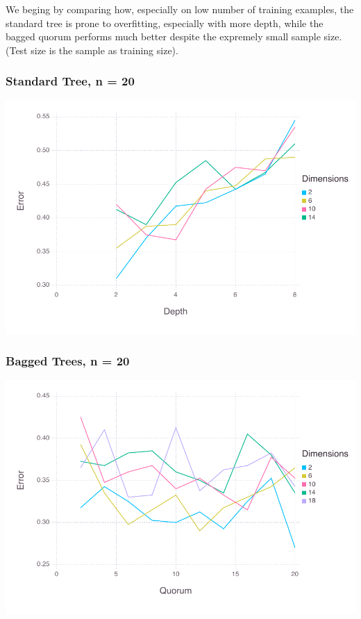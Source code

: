 \documentclass[a4paper,12pt]{article}
\begin{document}
We beging by comparing how, especially on low number of training examples, the standard tree is prone to overfitting, especially with more depth, while the bagged quorum performs much better despite the expremely small sample size. (Test size is the sample as training size).

\subsubsection*{Standard Tree, n = 20}
\includegraphics[width=\linewidth]{figures/problemset_2_1.pdf}



\subsubsection*{Bagged Trees, n = 20}
\includegraphics[width=\linewidth]{figures/problemset_3_1.pdf}
\end{document}
